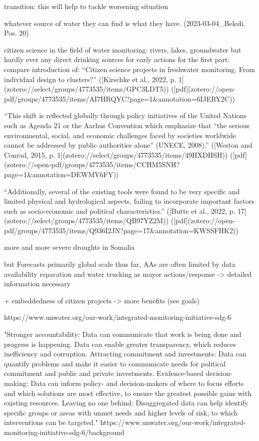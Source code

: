 
transition: this will help to tackle worsening situation

whatever source of water they can find is what they have. (2023-03-04_Beledi, Pos. 20)

citizen science in the field of water monitoring: rivers, lakes, groundwater but hardly ever any direct drinking sources for early actions
for the first part: compare introduction of: “Citizen science projects in freshwater monitoring. From individual design to clusters?” ([Kirschke et al., 2022, p. 1](zotero://select/groups/4773535/items/GPC3LDT5)) ([pdf](zotero://open-pdf/groups/4773535/items/AI7HRQYC?page=1&annotation=6IJERY2C))


“This shift is reflected globally through policy initiatives of the United Nations such as Agenda 21 or the Aarhus Convention which emphasize that “the serious environmental, social, and economic challenges faced by societies worldwide cannot be addressed by public authorities alone” (UNECE, 2008).” ([Weston and Conrad, 2015, p. 1](zotero://select/groups/4773535/items/49HXDHSH)) ([pdf](zotero://open-pdf/groups/4773535/items/CCHM5SNH?page=1&annotation=DEWMV6FY))

“Additionally, several of the existing tools were found to be very specific and limited physical and hydrological aspects, failing to incorporate important factors such as socio-economic and political characteristics.” ([Butte et al., 2022, p. 17](zotero://select/groups/4773535/items/QB97YZ2M)) ([pdf](zotero://open-pdf/groups/4773535/items/Q936I2JN?page=17&annotation=KWSSFHK2))

more and more severe droughts in Somalia

but Forecasts primarily global scale
thus far, AAs are often limited by data availability
reparation and water trucking as mayor actions/response -> detailed information necessary

+ embeddedness of citizen projects -> more benefits (see goals)

https://www.unwater.org/our-work/integrated-monitoring-initiative-sdg-6

"Stronger accountability: Data can communicate that work is being done and progress is happening. Data can enable greater transparency, which reduces inefficiency and corruption.
Attracting commitment and investments: Data can quantify problems and make it easier to communicate needs for political commitment and public and private investments.
Evidence-based decision-making: Data can inform policy- and decision-makers of where to focus efforts and which solutions are most effective, to ensure the greatest possible gains with existing resources.
Leaving no one behind: Disaggregated data can help identify specific groups or areas with unmet needs and higher levels of risk, to which interventions can be targeted."
https://www.unwater.org/our-work/integrated-monitoring-initiative-sdg-6/background

